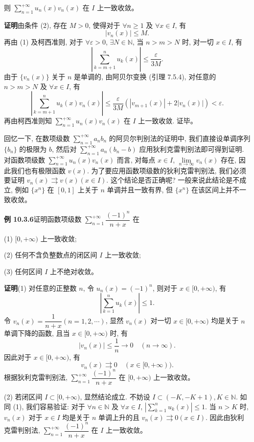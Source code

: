 \documentclass[UTF8, 12pt, fontset=fandol, oneside]{ctexart}
\begin{document}
则 $\sum\limits_{n=1}^{+\infty}u_n(x)v_n(x)$ 在 $I$ 上一致收敛。

\noindent\textbf{证明}\quad 由条件 (2), 存在 $M>0$, 使得对于 $\forall n\geq1$ 及 $\forall x\in I$, 有
\[
  |v_n(x)|\leq M.
\]
再由 (1) 及柯西准则, 对于 $\forall\varepsilon>0$, $\exists N\in\mathbb N$, 当 $n>m>N$ 时, 对一切 $x\in I$, 有
\[
  \left|\sum_{k=m+1}^n u_k(x)\right|\leq\frac{\varepsilon}{3M}.
\]
由于 $\{v_n(x)\}$ 关于 $n$ 是单调的, 由阿贝尔变换 (引理 7.5.4), 对任意的 $n>m>N$ 及 $\forall x\in I$, 有
\[
  \left|\sum_{k=m+1}^n u_k(x)v_n(x)\right|
  \leq\frac{\varepsilon}{3M}(|v_{m+1}(x)|+2|v_n(x)|)<\varepsilon.
\]
再由柯西准则知 $\sum\limits_{n=1}^{+\infty}u_n(x)v_n(x)$ 在 $I$ 上一致收敛. 证毕。

回忆一下, 在数项级数 $\sum\limits_{n=1}^{+\infty}a_nb_n$ 的阿贝尔判别法的证明中, 我们直接设单调序列 $\{b_n\}$ 的极限为 $b$, 然后对 $\sum\limits_{n=1}^{+\infty}a_n(b_n-b)$ 应用狄利克雷判别法即可得到证明. 对函数项级数 $\sum\limits_{n=1}^{+\infty}u_n(x)v_n(x)$ 而言, 对每点 $x\in I$, $\lim\limits_{n\to\infty}v_n(x)$ 存在, 因此我们也有极限函数 $v(x)$. 为了要应用函数项级数的狄利克雷判别法, 我们必须要证明 $v_n(x)\rightrightarrows v(x)(x\in I)$. 这个结论是否正确呢? 一般来说此结论是不成立, 例如 $\{x^n\}$ 在 $[0,1]$ 上关于 $n$ 单调并且一致有界, 但 $\{x^n\}$ 在该区间上并不一致收敛。

\noindent\textbf{例 10.3.6}\quad 证明函数项级数 $\sum\limits_{n=1}^{+\infty}\dfrac{(-1)^n}{n+x}$ 在

(1) $[0,+\infty)$ 上一致收敛;

(2) 任何不含负整数点的闭区间 $I$ 上一致收敛;

(3) 任何区间 $I$ 上不绝对收敛。

\noindent\textbf{证明}\quad (1) 对任意的正整数 $n$, 令 $u_n(x)=(-1)^n$, 则对于 $x\in[0,+\infty)$, 有
\[
  \left|\sum_{k=1}^n u_k(x)\right|\leq1.
\]
令 $v_n(x)=\dfrac1{n+x}(n=1,2,\cdots)$, 显然 $v_n(x)$ 对一切 $x\in[0,+\infty)$ 均是关于 $n$ 单调下降的函数, 且当 $x\in[0,+\infty)$ 时, 有
\[
  |v_n(x)|\leq\frac1n\to0\quad(n\to\infty).
\]
因此对于 $x\in[0,+\infty)$, 有
\[
  v_n(x)\rightrightarrows0\quad(x\in[0,+\infty)).
\]
根据狄利克雷判别法, $\sum\limits_{n=1}^{+\infty}\dfrac{(-1)^n}{n+x}$ 在 $[0,+\infty)$ 上一致收敛。

(2) 若闭区间 $I\subset[0,+\infty)$, 显然结论成立. 不妨设 $I\subset(-K,-K+1), K\in\mathbb N$. 如同 (1), 我们容易验证: 对于 $\forall n\in\mathbb N$ 及 $\forall x\in I$, $\left|\sum\limits_{k=1}^n u_k(x)\right|\leq1$. 当 $n>K$ 时, $v_n(x)$ 对于 $x\in I$ 均是关于 $n$ 单调上升的且 $v_n(x)\rightrightarrows0(x\in I)$. 因此由狄利克雷判别法, $\sum\limits_{n=1}^{+\infty}\dfrac{(-1)^n}{n+x}$ 在 $I$ 上一致收敛。
\end{document}
